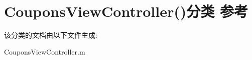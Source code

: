 \hypertarget{category_coupons_view_controller_07_08}{\section{Coupons\-View\-Controller()分类 参考}
\label{category_coupons_view_controller_07_08}
}


该分类的文档由以下文件生成\-:\begin{DoxyCompactItemize}
\item 
Coupons\-View\-Controller.\-m\end{DoxyCompactItemize}
